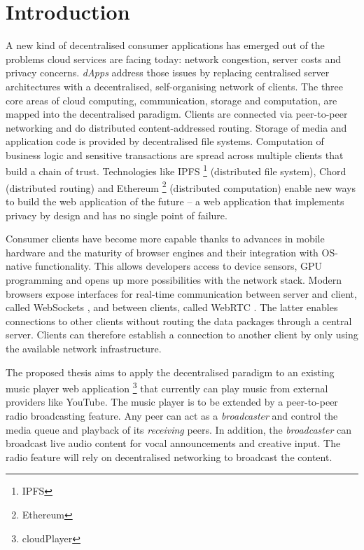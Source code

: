 \section{Introduction}

A new kind of decentralised consumer applications has emerged out of the problems cloud services are facing today: network congestion,
server costs and privacy concerns. \textit{dApps} address those issues by replacing centralised server architectures with a decentralised, self-organising network of clients. The three core areas of cloud computing, communication, storage and computation, are mapped into the decentralised paradigm. Clients are connected via peer-to-peer networking and do distributed content-addressed routing. Storage of media and application code is provided by decentralised file systems. Computation of business logic and sensitive transactions are spread across multiple clients that build a chain of trust. Technologies like IPFS \footnote{IPFS} (distributed file system), Chord \cite{chord} (distributed routing) and Ethereum \footnote{Ethereum} (distributed computation) enable new ways to build the web application of the future – a web application that implements privacy by design and has no single point of failure.

Consumer clients have become more capable thanks to advances in mobile hardware and the maturity of browser engines and their integration with OS-native functionality. This allows developers access to device sensors, GPU programming and opens up more possibilities with the network stack. Modern browsers expose interfaces for real-time communication between server and client, called WebSockets \cite{rfc6455}, and between clients, called WebRTC \cite{webRTCpage}. The latter enables connections to other clients without routing the data packages through a central server. Clients can therefore establish a connection to another client by only using the available network infrastructure.

The proposed thesis aims to apply the decentralised paradigm to an existing music player web application \footnote{cloudPlayer} that currently can play music from external providers like YouTube. The music player is to be extended by a peer-to-peer radio broadcasting feature. Any peer can act as a \textit{broadcaster} and control the media queue and playback of its \textit{receiving} peers. In addition, the \textit{broadcaster} can broadcast live audio content for vocal announcements and creative input. The radio feature will rely on decentralised networking to broadcast the content.

